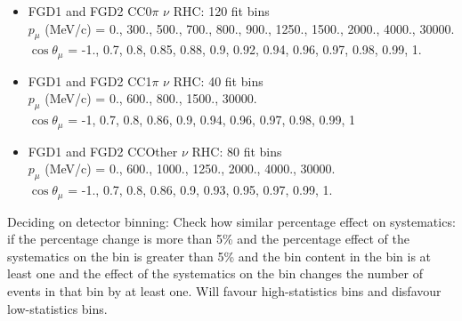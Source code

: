 \begin{itemize}
  \item FGD1 and FGD2 CC0$\pi$ $\nu$ RHC: 120 fit bins \\
    $p_\mu$ (MeV/c) = 0., 300., 500., 700., 800., 900., 1250., 1500., 2000., 4000., 30000.\\
     $\cos\theta_\mu$ = -1., 0.7, 0.8, 0.85, 0.88, 0.9, 0.92, 0.94, 0.96, 0.97, 0.98, 0.99, 1.

   \item FGD1 and FGD2 CC1$\pi$ $\nu$ RHC: 40 fit bins \\
     $p_\mu$ (MeV/c) = 0., 600., 800., 1500., 30000.\\
      $\cos\theta_\mu$ = -1, 0.7, 0.8, 0.86, 0.9, 0.94, 0.96, 0.97, 0.98, 0.99, 1

    \item FGD1 and FGD2 CCOther $\nu$ RHC: 80 fit bins \\
      $p_\mu$ (MeV/c) = 0., 600., 1000., 1250., 2000., 4000., 30000.\\
       $\cos\theta_\mu$ = -1., 0.7, 0.8, 0.86, 0.9, 0.93, 0.95, 0.97, 0.99, 1.
\end{itemize}

    Deciding on detector binning: 
    Check how similar percentage effect on systematics: if the percentage change is more than 5\% and the percentage effect of the systematics on the bin is greater than 5\% and the bin content in the bin is at least one and the effect of the systematics on the bin changes the number of events in that bin by at least one.
    Will favour high-statistics bins and disfavour low-statistics bins.

